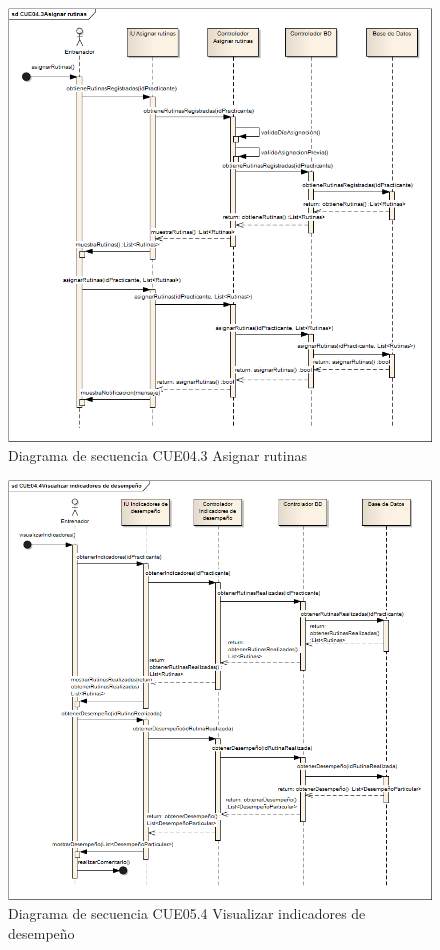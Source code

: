 \begin{figure}[H]
	\begin{center}
		\includegraphics[scale=0.6]{./Figuras/Secuencias/CUE04_3Asignar_rutinas}
	\end{center}
	\caption{Diagrama de secuencia CUE04.3 Asignar rutinas}
	\label{fig:SE_CUE043}
\end{figure}

\begin{figure}[H]
	\begin{center}
		\includegraphics[scale=0.6]{./Figuras/Secuencias/CUE04_4Visualizar_indicadores_de_desempeno}
	\end{center}
	\caption{Diagrama de secuencia CUE05.4 Visualizar indicadores de desempeño}
	\label{fig:SE_CUE044}
\end{figure}

